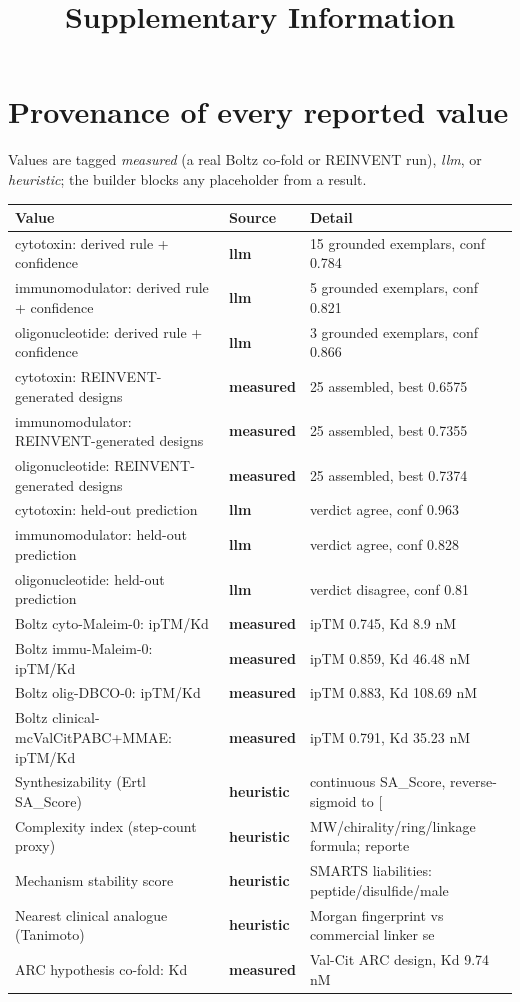 \documentclass[10pt]{article}
\title{\textbf{Supplementary Information}}
\author{}
\date{}
\begin{document}
\maketitle
\sloppy
\section{Provenance of every reported value}
Values are tagged \emph{measured} (a real Boltz co-fold or REINVENT run), \emph{llm}, or \emph{heuristic}; the builder blocks any placeholder from a result.

\begin{table}[h]\centering\scriptsize\begin{tabular}{l l l}\toprule Value & Source & Detail \\ \midrule cytotoxin: derived rule + confidence & \textbf{llm} & 15 grounded exemplars, conf 0.784 \\
immunomodulator: derived rule + confidence & \textbf{llm} & 5 grounded exemplars, conf 0.821 \\
oligonucleotide: derived rule + confidence & \textbf{llm} & 3 grounded exemplars, conf 0.866 \\
cytotoxin: REINVENT-generated designs & \textbf{measured} & 25 assembled, best 0.6575 \\
immunomodulator: REINVENT-generated designs & \textbf{measured} & 25 assembled, best 0.7355 \\
oligonucleotide: REINVENT-generated designs & \textbf{measured} & 25 assembled, best 0.7374 \\
cytotoxin: held-out prediction & \textbf{llm} & verdict agree, conf 0.963 \\
immunomodulator: held-out prediction & \textbf{llm} & verdict agree, conf 0.828 \\
oligonucleotide: held-out prediction & \textbf{llm} & verdict disagree, conf 0.81 \\
Boltz cyto-Maleim-0: ipTM/Kd & \textbf{measured} & ipTM 0.745, Kd 8.9 nM \\
Boltz immu-Maleim-0: ipTM/Kd & \textbf{measured} & ipTM 0.859, Kd 46.48 nM \\
Boltz olig-DBCO-0: ipTM/Kd & \textbf{measured} & ipTM 0.883, Kd 108.69 nM \\
Boltz clinical-mcValCitPABC+MMAE: ipTM/Kd & \textbf{measured} & ipTM 0.791, Kd 35.23 nM \\
Synthesizability (Ertl SA\_Score) & \textbf{heuristic} & continuous SA\_Score, reverse-sigmoid to [ \\
Complexity index (step-count proxy) & \textbf{heuristic} & MW/chirality/ring/linkage formula; reporte \\
Mechanism stability score & \textbf{heuristic} & SMARTS liabilities: peptide/disulfide/male \\
Nearest clinical analogue (Tanimoto) & \textbf{heuristic} & Morgan fingerprint vs commercial linker se \\
ARC hypothesis co-fold: Kd & \textbf{measured} & Val-Cit ARC design, Kd 9.74 nM \\ \bottomrule\end{tabular}\end{table}
\end{document}
